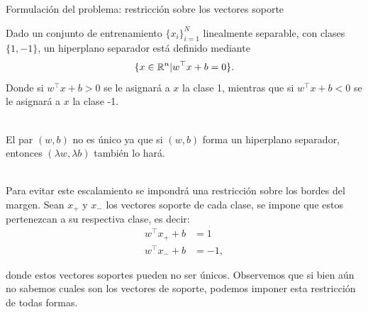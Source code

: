 \documentclass[handout, 9pt]{beamer}
\begin{document}
\begin{frame}{Formulación del problema: restricción sobre los vectores soporte}

Dado un conjunto de entrenamiento $\{x_i\}_{i=1}^N$ linealmente separable, con clases $\{1,-1\}$, un hiperplano separador está definido mediante
\begin{equation*}
    \{x\in \mathbb{R}^n | w^\top x + b = 0 \}.
\end{equation*}
Donde si $w^\top x + b >0$ se le asignará a $x$ la clase 1, mientras que si $w^\top x + b <0$ se le asignará a $x$ la clase -1.\\~\ \pause

El par $(w,b)$ no es único ya que si $(w,b)$ forma un hiperplano separador, entonces $(\lambda w, \lambda b)$ también lo hará.\\~\ \pause

Para evitar este escalamiento se impondrá una restricción sobre los bordes del margen. Sean $x_{+}$ y $x_{-}$ los vectores soporte de cada clase, se impone que estos pertenezcan a su respectiva clase, es decir:
\begin{align*}
 	w^\top x_{+} + b &= 1\\
 	w^\top x_{-} + b &=  -1,
 \end{align*}
 
 donde estos vectores soportes pueden no ser únicos. Observemos que si bien aún no sabemos cuales son los vectores de soporte, podemos imponer esta restricción de todas formas.
 	
\end{frame}
\end{document}
